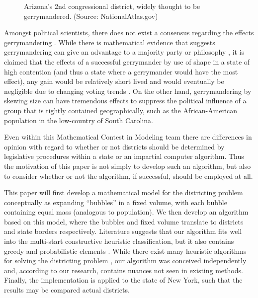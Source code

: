 \documentclass[11pt]{article}				%
\begin{document}
\begin{figure}
\begin{center}
\end{center}
\caption{Arizona's 2nd congressional district, widely thought to be
gerrymandered. (Source: NationalAtlas.gov)}
\label{fig:arizona}
\end{figure}

Amongst political scientists, there does not exist a consensus regarding
the effects gerrymandering \cite{ref:mcdonald}. While there is
mathematical evidence that suggests gerrymandering can give an advantage
to a majority party or philosophy \cite{ref:howto}, it is claimed that
the effects of a successful gerrymander by use of shape in a state of
high contention (and thus a state where a gerrymander would have the most 
effect), any gain would be relatively short lived and would eventually be 
negligible due to changing voting trends \cite{ref:analyzing}. On the
other hand, gerrymandering by skewing size can have tremendous effects to 
suppress the political influence of a group that is tightly contained
geographically, such as the African-American population in the
low-country of South Carolina.

Even within this Mathematical Contest in Modeling team there are
differences in opinion with regard to whether or not districts should be
determined by legislative procedures within a state or an impartial
computer algorithm. Thus the motivation of this paper is not simply to
develop such an algorithm, but also to consider whether or not the
algorithm, if successful, should be employed at all.

This paper will first develop a mathematical model for the districting
problem conceptually as expanding “bubbles” in a fixed volume, with
each bubble containing equal mass (analogous to population). We then
develop an algorithm based on this model, where the bubbles and fixed
volume translate to districts and state borders respectively. Literature
suggests that our algorithm fits well into the multi-start constructive
heuristic classification, but it also contains greedy and probabilistic
elements \cite{ref:overview} \cite{ref:orbook}. While there exist many
heuristic algorithms for solving the districting problem
\cite{ref:heuristic1} \cite{ref:heuristic2} \cite{ref:heuristic3}, our
algorithm was conceived independently and, according to our research,
contains nuances not seen in existing methods. Finally, the
implementation is applied to the state of New York, such that the results 
may be compared actual districts.
\end{document}
